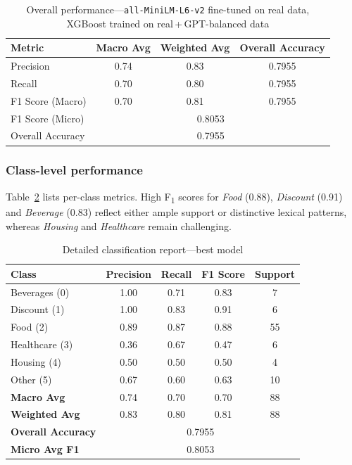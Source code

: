 \documentclass{SGGW-thesis-EN}
\begin{document}
\begin{table}[h]
  \centering
  \caption{Overall performance—\texttt{all-MiniLM-L6-v2} fine-tuned on real data, XGBoost trained on real\,+\,GPT-balanced data}
  \label{tab:best_model_summary}
  \begin{tabularx}{\textwidth}{lccc}
    \toprule
    \textbf{Metric} & \textbf{Macro Avg} & \textbf{Weighted Avg} & \textbf{Overall Accuracy} \\
    \midrule
    Precision        & 0.74 & 0.83 & 0.7955 \\
    Recall           & 0.70 & 0.80 & 0.7955 \\
    F1 Score (Macro) & 0.70 & 0.81 & 0.7955 \\
    F1 Score (Micro) & \multicolumn{3}{c}{0.8053} \\
    Overall Accuracy & \multicolumn{3}{c}{0.7955} \\
    \bottomrule
  \end{tabularx}
\end{table}

\subsubsection*{Class-level performance}
Table~\ref{tab:best_model_report} lists per-class metrics.
High F\textsubscript{1} scores for \emph{Food} (0.88), \emph{Discount} (0.91) and \emph{Beverage} (0.83) reflect either
ample support or distinctive lexical patterns, whereas \emph{Housing} and \emph{Healthcare} remain challenging.

\begin{table}[h]
  \centering
  \caption{Detailed classification report—best model}
  \label{tab:best_model_report}
  \begin{tabularx}{\textwidth}{lcccc}
    \toprule
    \textbf{Class} & \textbf{Precision} & \textbf{Recall} & \textbf{F1 Score} & \textbf{Support} \\
    \midrule
    Beverages (0)  & 1.00 & 0.71 & 0.83 & 7  \\
    Discount  (1)  & 1.00 & 0.83 & 0.91 & 6  \\
    Food      (2)  & 0.89 & 0.87 & 0.88 & 55 \\
    Healthcare (3) & 0.36 & 0.67 & 0.47 & 6  \\
    Housing    (4) & 0.50 & 0.50 & 0.50 & 4  \\
    Other      (5) & 0.67 & 0.60 & 0.63 & 10 \\
    \midrule
    \textbf{Macro Avg}        & 0.74 & 0.70 & 0.70 & 88 \\
    \textbf{Weighted Avg}     & 0.83 & 0.80 & 0.81 & 88 \\
    \textbf{Overall Accuracy} & \multicolumn{4}{c}{0.7955} \\
    \textbf{Micro Avg F1}     & \multicolumn{4}{c}{0.8053} \\
    \bottomrule
  \end{tabularx}
\end{table}
\end{document}
